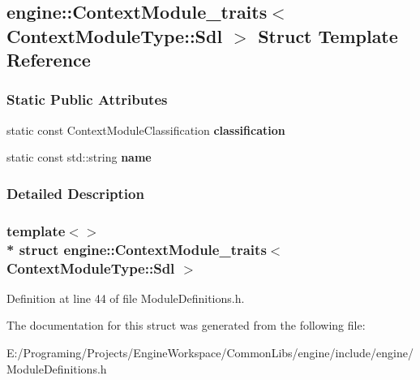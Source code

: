 \hypertarget{a00016}{}\subsection{engine\+:\+:Context\+Module\+\_\+traits$<$ Context\+Module\+Type\+:\+:Sdl $>$ Struct Template Reference}
\label{a00016}
\subsubsection*{Static Public Attributes}
\begin{DoxyCompactItemize}
\item 
static const Context\+Module\+Classification {\bfseries classification}\hypertarget{a00016_a29e011a5450db531464fa89705f7fd16}{}\label{a00016_a29e011a5450db531464fa89705f7fd16}

\item 
static const std\+::string {\bfseries name}\hypertarget{a00016_aaffd24695252e25d995dcd03dde5f0ba}{}\label{a00016_aaffd24695252e25d995dcd03dde5f0ba}

\end{DoxyCompactItemize}


\subsubsection{Detailed Description}
\subsubsection*{template$<$$>$\\*
struct engine\+::\+Context\+Module\+\_\+traits$<$ Context\+Module\+Type\+::\+Sdl $>$}



Definition at line 44 of file Module\+Definitions.\+h.



The documentation for this struct was generated from the following file\+:\begin{DoxyCompactItemize}
\item 
E\+:/\+Programing/\+Projects/\+Engine\+Workspace/\+Common\+Libs/engine/include/engine/Module\+Definitions.\+h\end{DoxyCompactItemize}
